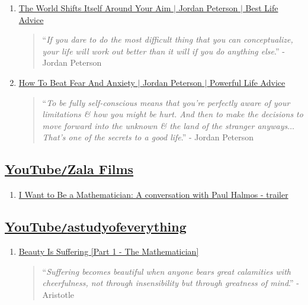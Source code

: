 \documentclass{article}
\begin{document}
\begin{enumerate}
	\item \href{https://www.youtube.com/watch?v=zRYjVFFsi38}{The World Shifts Itself Around Your Aim $|$ Jordan Peterson $|$ Best Life Advice}    
	\begin{quotation}
		``{\it If you dare to do the most difficult thing that you can conceptualize, your life will work out better than it will if you do anything else}.'' - Jordan Peterson
	\end{quotation}
	\item \href{https://www.youtube.com/watch?v=bb9g9mtDHZo}{How To Beat Fear And Anxiety $|$ Jordan Peterson $|$ Powerful Life Advice}    
	\begin{quotation}
		``{\it To be fully self-conscious means that you're perfectly aware of your limitations \& how you might be hurt. And then to make the decisions to move forward into the unknown \& the land of the stranger anyways$\ldots$ That's one of the secrets to a good life}.'' - Jordan Peterson
	\end{quotation}
\end{enumerate}


\subsection{\href{https://www.youtube.com/channel/UCrBsO0_kjefBUQPNgaELGGw}{YouTube\texttt{/}Zala Films}}
\begin{enumerate}
	\item \href{https://www.youtube.com/watch?v=ONvYPldXoZs}{I Want to Be a Mathematician: A conversation with Paul Halmos - trailer}
\end{enumerate}


\subsection{\href{https://www.youtube.com/channel/UCDok3oTo2SSWZt6I8sHuzVg}{YouTube\texttt{/}astudyofeverything}}
\begin{enumerate}
	\item \href{https://www.youtube.com/watch?v=i0UTeQfnzfM}{Beauty Is Suffering [Part 1 - The Mathematician]}
	\begin{quotation}
		``{\it Suffering becomes beautiful when anyone bears great calamities with cheerfulness, not through insensibility but through greatness of mind}.'' - Aristotle
	\end{quotation}
\end{enumerate}
\end{document}
